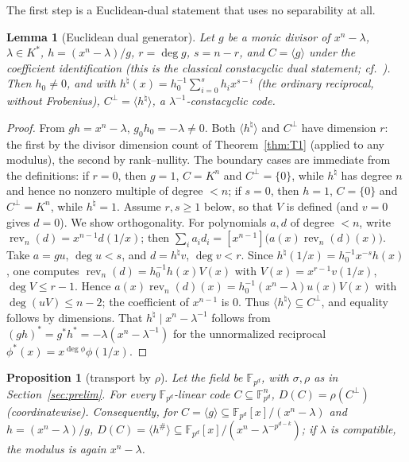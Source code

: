 \documentclass[10pt,journal,draftclsnofoot,onecolumn]{IEEEtran}
\newtheorem{lemma}[theorem]{Lemma}
\newtheorem{proposition}[theorem]{Proposition}
\theoremstyle{definition}
\theoremstyle{remark}
\begin{document}
The first step is a Euclidean-dual statement that uses no separability
at all.

\begin{lemma}[Euclidean dual generator]\label{lem:RR3}
Let \(g\) be a monic divisor of \(x^n - \lambda\), \(\lambda \in K^*\),
\(h = (x^n-\lambda)/g\), \(r = \deg g\), \(s = n - r\), and
\(C = \langle g \rangle\) under the coefficient identification (this is
the classical constacyclic dual statement;
cf.~\cite{HP2003, MS1977}). Then
\(h_0 \ne 0\), and with
\(h^{\natural}(x) = h_0^{-1} \sum_{i=0}^{s} h_i x^{s-i}\) (the ordinary
reciprocal, without Frobenius),
\(C^\perp = \langle h^{\natural} \rangle\), a \(\lambda^{-1}\)-constacyclic
code.
\end{lemma}

\begin{proof}
From \(gh = x^n - \lambda\), \(g_0 h_0 = -\lambda \ne 0\). Both
\(\langle h^{\natural} \rangle\) and \(C^\perp\) have dimension \(r\):
the first by the divisor dimension count of Theorem~\ref{thm:T1}
(applied to any modulus), the second by rank--nullity. The boundary
cases are immediate from the definitions: if \(r = 0\), then \(g = 1\),
\(C = K^n\) and \(C^\perp = \{0\}\), while \(h^{\natural}\) has degree
\(n\) and hence no nonzero multiple of degree \(< n\); if \(s = 0\), then
\(h = 1\), \(C = \{0\}\) and \(C^\perp = K^n\), while
\(h^{\natural} = 1\). Assume \(r, s \ge 1\) below, so that \(V\) is
defined (and \(v = 0\) gives \(d = 0\)). We show orthogonality. For polynomials \(a, d\) of degree \(< n\), write
\(\operatorname{rev}_n(d) = x^{n-1} d(1/x)\); then
\(\sum_i a_i d_i = [x^{n-1}]\big(a(x) \operatorname{rev}_n(d)(x)\big)\).
Take \(a = gu\), \(\deg u < s\), and \(d = h^{\natural} v\),
\(\deg v < r\). Since
\(h^{\natural}(1/x) = h_0^{-1} x^{-s} h(x)\), one computes
\(\operatorname{rev}_n(d) = h_0^{-1} h(x) V(x)\) with
\(V(x) = x^{r-1} v(1/x)\), \(\deg V \le r-1\). Hence
\(a(x)\operatorname{rev}_n(d)(x) = h_0^{-1} (x^n - \lambda) u(x) V(x)\)
with \(\deg(uV) \le n-2\); the coefficient of \(x^{n-1}\) is \(0\).
Thus \(\langle h^{\natural}\rangle \subseteq C^\perp\), and equality
follows by dimensions. That \(h^{\natural} \mid x^n - \lambda^{-1}\)
follows from \((gh)^* = g^* h^* = -\lambda(x^n - \lambda^{-1})\) for the
unnormalized reciprocal \(\phi^*(x) = x^{\deg\phi}\phi(1/x)\).
\end{proof}

\begin{proposition}[transport by \(\rho\)]\label{prop:transport}
Let the field be \(\mathbb{F}_{p^d}\), with \(\sigma, \rho\) as in
Section~\ref{sec:prelim}. For every \(\mathbb{F}_{p^d}\)-linear code
\(C \subseteq \mathbb{F}_{p^d}^n\),
\(D(C) = \rho(C^\perp)\) (coordinatewise). Consequently, for
\(C = \langle g \rangle \subseteq \mathbb{F}_{p^d}[x]/(x^n-\lambda)\) and
\(h = (x^n-\lambda)/g\),
\(D(C) = \langle h^{\#} \rangle \subseteq
\mathbb{F}_{p^d}[x]/(x^n - \lambda^{-p^{d-k}})\); if \(\lambda\) is
compatible, the modulus is again \(x^n - \lambda\).
\end{proposition}
\end{document}
